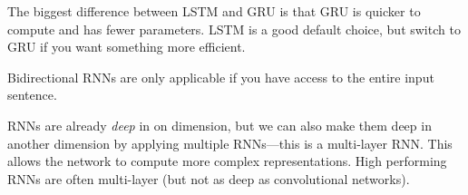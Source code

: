 \documentclass{article}
\begin{document}
The biggest difference between LSTM and GRU is that GRU is quicker to compute and has fewer parameters. LSTM is a good default choice, but switch to GRU if you want something more efficient. \\ 

\begin{remark}
  Bidirectional RNNs are only applicable if you have access to the entire input sentence. 
\end{remark}

RNNs are already \emph{deep} in on dimension, but we can also make them deep in another dimension by applying multiple RNNs---this is a multi-layer RNN. This allows the network to compute more complex representations. High performing RNNs are often multi-layer (but not as deep as convolutional networks). 
\end{document}
